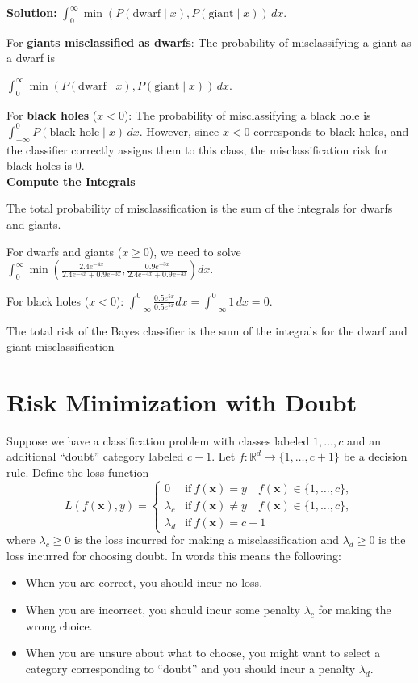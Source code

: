 \documentclass{article}
\newcommand{\Question}[1]{\Large \section{ #1 } \normalsize}
\renewcommand{\vec}[1]{\boldsymbol{\mathbf{#1}}}
\newenvironment{solution}{\color{blue} \smallskip \textbf{Solution:}}{}
\begin{document}
\begin{enumerate}
\begin{solution}
\( \int_0^\infty \min\left(P(\text{dwarf} \mid x), P(\text{giant} \mid x)\right) \, dx \).

For \textbf{giants misclassified as dwarfs}: The probability of misclassifying a giant as a dwarf is 

\( \int_0^\infty \min\left(P(\text{dwarf} \mid x), P(\text{giant} \mid x)\right) \, dx \). 

For \textbf{black holes} (\(x < 0\)): The probability of misclassifying a black hole is \( \int_{-\infty}^0 P(\text{black hole} \mid x) \, dx \). However, since \(x < 0\) corresponds to black holes, and the classifier correctly assigns them to this class, the misclassification risk for black holes is 0.\\

\textbf{Compute the Integrals}

The total probability of misclassification is the sum of the integrals for dwarfs and giants.

For dwarfs and giants (\(x \geq 0\)), we need to solve \( \int_0^\infty \min\left(\frac{2.4 e^{-4x}}{2.4 e^{-4x} + 0.9 e^{-3x}}, \frac{0.9 e^{-3x}}{2.4 e^{-4x} + 0.9 e^{-3x}}\right) dx \).

For black holes (\(x < 0\)): \( \int_{-\infty}^0 \frac{0.5 e^{5x}}{0.5 e^{5x}} dx = \int_{-\infty}^0 1 \, dx = 0 \).

The total risk of the Bayes classifier is the sum of the integrals for the dwarf and giant misclassification

\end{solution}

\end{enumerate}

\newpage
\Question{Risk Minimization with Doubt}

Suppose we have a classification problem with classes labeled $1, \dotsc, c$ and an additional ``doubt'' category labeled $c+1$. Let $f : \mathbb{R}^d \to \{1, \dots, c+1 \}$ be a decision rule. Define the loss function
\begin{equation}
L(f(\vec{x}), y) =
\begin{cases}
0 &  						 \mathrm{if}\ f(\vec{x})=y \quad f(\vec{x}) \in\{1,\dotsc,c\}, \\
\lambda_c       & \mathrm{if}\ f(\vec{x})\neq y \quad f(\vec{x}) \in \{1,\dotsc,c\}, \\
\lambda_d       & \mathrm{if}\ f(\vec{x})=c+1
\end{cases}
\end{equation}
where $\lambda_c \geq 0$ is the loss incurred for making a misclassification and $\lambda_d \geq 0$ is the loss incurred for choosing doubt. In words this means the following:
\begin{itemize}
	\item When you are correct, you should incur no loss.
	\item When you are incorrect, you should incur some penalty $\lambda_c$ for making the wrong choice.
	\item When you are unsure about what to choose, you might want to select a category corresponding to ``doubt'' and you should incur a penalty $\lambda_d$.
\end{itemize}
\end{document}
